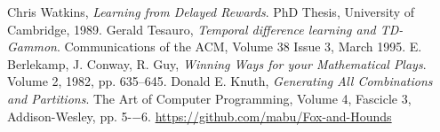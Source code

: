 \documentclass[a4paper]{article}
\begin{document}
\begin{thebibliography}{9}
    Chris Watkins,
    {\em Learning from Delayed Rewards}.
    PhD Thesis, University of Cambridge, 1989.
    Gerald Tesauro,
    {\em Temporal difference learning and TD-Gammon}.
    Communications of the ACM,
    Volume 38 Issue 3, March 1995.
    E. Berlekamp, J. Conway, R. Guy,
    {\em Winning Ways for your Mathematical Plays}.
    Volume 2, 1982, pp. 635--645.
    Donald E. Knuth,
    {\em Generating All Combinations and Partitions}.
    The Art of Computer Programming, Volume 4, Fascicle 3, Addison-Wesley, pp.
    5-−6.
    \url{https://github.com/mabu/Fox-and-Hounds}
\end{thebibliography}
\end{document}
